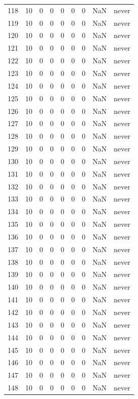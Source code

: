 \begin{longtable}{rrrrrrrrl}
118 & 10 & 0 & 0 & 0 & 0 & 0 & NaN & never \\
119 & 10 & 0 & 0 & 0 & 0 & 0 & NaN & never \\
120 & 10 & 0 & 0 & 0 & 0 & 0 & NaN & never \\
121 & 10 & 0 & 0 & 0 & 0 & 0 & NaN & never \\
122 & 10 & 0 & 0 & 0 & 0 & 0 & NaN & never \\
123 & 10 & 0 & 0 & 0 & 0 & 0 & NaN & never \\
124 & 10 & 0 & 0 & 0 & 0 & 0 & NaN & never \\
125 & 10 & 0 & 0 & 0 & 0 & 0 & NaN & never \\
126 & 10 & 0 & 0 & 0 & 0 & 0 & NaN & never \\
127 & 10 & 0 & 0 & 0 & 0 & 0 & NaN & never \\
128 & 10 & 0 & 0 & 0 & 0 & 0 & NaN & never \\
129 & 10 & 0 & 0 & 0 & 0 & 0 & NaN & never \\
130 & 10 & 0 & 0 & 0 & 0 & 0 & NaN & never \\
131 & 10 & 0 & 0 & 0 & 0 & 0 & NaN & never \\
132 & 10 & 0 & 0 & 0 & 0 & 0 & NaN & never \\
133 & 10 & 0 & 0 & 0 & 0 & 0 & NaN & never \\
134 & 10 & 0 & 0 & 0 & 0 & 0 & NaN & never \\
135 & 10 & 0 & 0 & 0 & 0 & 0 & NaN & never \\
136 & 10 & 0 & 0 & 0 & 0 & 0 & NaN & never \\
137 & 10 & 0 & 0 & 0 & 0 & 0 & NaN & never \\
138 & 10 & 0 & 0 & 0 & 0 & 0 & NaN & never \\
139 & 10 & 0 & 0 & 0 & 0 & 0 & NaN & never \\
140 & 10 & 0 & 0 & 0 & 0 & 0 & NaN & never \\
141 & 10 & 0 & 0 & 0 & 0 & 0 & NaN & never \\
142 & 10 & 0 & 0 & 0 & 0 & 0 & NaN & never \\
143 & 10 & 0 & 0 & 0 & 0 & 0 & NaN & never \\
144 & 10 & 0 & 0 & 0 & 0 & 0 & NaN & never \\
145 & 10 & 0 & 0 & 0 & 0 & 0 & NaN & never \\
146 & 10 & 0 & 0 & 0 & 0 & 0 & NaN & never \\
147 & 10 & 0 & 0 & 0 & 0 & 0 & NaN & never \\
148 & 10 & 0 & 0 & 0 & 0 & 0 & NaN & never \\

\end{longtable}
